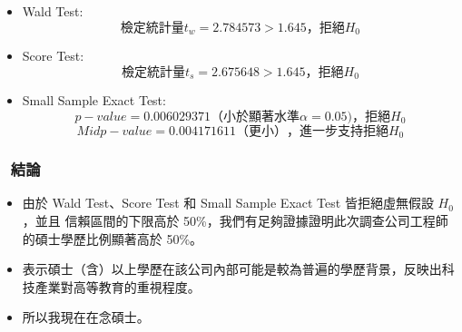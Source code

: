\documentclass[
]{article}
\providecommand{\tightlist}{%
  \setlength{\itemsep}{0pt}\setlength{\parskip}{0pt}}
\begin{document}
\begin{itemize}
\tightlist
\item
  Wald Test: \[檢定統計量t_w = 2.784573 > 1.645，拒絕H_0\]
\item
  Score Test: \[檢定統計量t_s = 2.675648 > 1.645，拒絕H_0\]
\item
  Small Sample Exact Test:
  \[p-value = 0.006029371（小於顯著水準 \alpha=0.05 )，拒絕H_0\]
  \[Mid p-value =  0.004171611（更小），進一步支持拒絕H_0\]
\end{itemize}

\hypertarget{ux7d50ux8ad6}{%
\subsubsection{📌 結論}\label{ux7d50ux8ad6}}

\begin{itemize}
\tightlist
\item
  由於 Wald Test、Score Test 和 Small Sample Exact Test 皆拒絕虛無假設
  \(H_0\)，並且 信賴區間的下限高於
  50\%，我們有足夠證據證明此次調查公司工程師的碩士學歷比例顯著高於
  50\%。
\item
  表示碩士（含）以上學歷在該公司內部可能是較為普遍的學歷背景，反映出科技產業對高等教育的重視程度。
\item
  所以我現在在念碩士。
\end{itemize}
\end{document}
